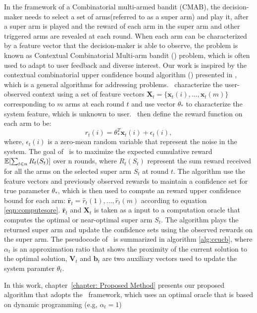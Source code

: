 In the framework of a Combinatorial multi-armed bandit (CMAB), the decision-maker needs to select a set of arms(referred to as a super arm) and play it,  after a super arm is played and the reward of each arm in the super arm and other triggered arms are revealed at each round. When each arm can be characterized by a feature vector that the decision-maker is able to observe, the problem is known as Contextual Combinatorial Multi-arm bandit (\ccmab) problem, which is often used to adapt to user feedback and diverse interest.
Our work is inspired by the contextual combinatorial upper confidence bound algorithm (\ccucb) presented in \cite{ccmab}, which is a general algorithms for addressing \ccmab problems. \ccucb\ characterize the user-observed context using a set of
feature vectors $\textbf{X}_t = \{\textbf{x}_t(i), ..., \textbf{x}_t(m)\}$ corresponding to $m$ arms at each round $t$ and use vector $\theta_*$ to characterize the system feature, which is unknown to user. 
\ccucb\ then define the reward function on each arm to be:
\begin{equation}
	\label{eqn:computesore}
	r_t(i) = \theta_*^T\textbf{x}_t(i) + \epsilon_t(i),
\end{equation}
where, $\epsilon_t(i)$ is a zero-mean random variable that represent the noise in the system. The goal of \ccucb\ is to maximize the expected cumulative reward $\operatorname{\mathbb{E}} [\sum_{t\in n}R_t(S_t)]$ over n rounds, where $R_t(S_t)$ represent the sum reward received for all the arms on the selected super arm $S_t$ at round $t$.
The algorithm use the feature vectors and previously observed rewards to maintain a confidence set for true parameter $\theta_*$, which is then used to compute an reward upper confidence bound for each arm:
$ \hat{\textbf{r}}_t = {\hat{r}_t(1), ..., \hat{r}_t(m)} $
according to equation \ref{eqn:computesore}. $\hat{\textbf{r}}_t$ and $\textbf{X}_t$ is taken as a input to a computation oracle that computes the optimal or near-optimal super arm $S_t$. The algorithm plays the returned super arm and update the confidence sets using the observed rewards on the super arm.
The pseudocode of \ccucb\ is summarized in algorithm \ref{alg:ccucb}, 
where $\alpha_t$ is an approximation ratio that shows the proximity of the current solution to the optimal solution, $\textbf{V}_t$ and $\textbf{b}_t$ are two auxiliary vectors used to update the system paramter $\theta_t$.

In this work, chapter~\ref{chapter: Proposed Method} presents our proposed algorithm that adopts the \ccucb\ framework, which uses an optimal oracle that is based on dynamic programming (e.g, $\alpha_t = 1$)

